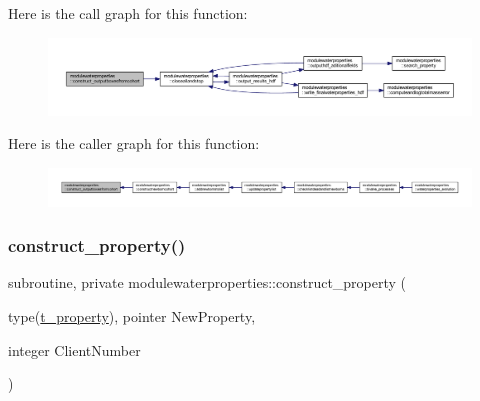 Here is the call graph for this function\+:\nopagebreak
\begin{figure}[H]
\begin{center}
\leavevmode
\includegraphics[width=350pt]{namespacemodulewaterproperties_a6f39106e418f143aa0c8fc86f0756562_cgraph}
\end{center}
\end{figure}
Here is the caller graph for this function\+:\nopagebreak
\begin{figure}[H]
\begin{center}
\leavevmode
\includegraphics[width=350pt]{namespacemodulewaterproperties_a6f39106e418f143aa0c8fc86f0756562_icgraph}
\end{center}
\end{figure}
\mbox{\label{namespacemodulewaterproperties_a87d8b877e916e4ea3318d7d568732d12}} 
\subsubsection{\texorpdfstring{construct\+\_\+property()}{construct\_property()}}
{\footnotesize\ttfamily subroutine, private modulewaterproperties\+::construct\+\_\+property (\begin{DoxyParamCaption}\item[{type(\mbox{\hyperlink{structmodulewaterproperties_1_1t__property}{t\+\_\+property}}), pointer}]{New\+Property,  }\item[{integer}]{Client\+Number }\end{DoxyParamCaption})\hspace{0.3cm}{\ttfamily [private]}}

